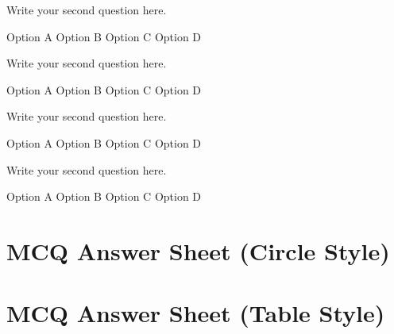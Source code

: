 \documentclass[a4paper,14pt,oneside]{hcmusquiz}
\begin{document}
\begin{questions}
    \question[1] Write your second question here.

    \begin{oneparchoices}
        \choice Option A
        \choice Option B
        \correctchoice Option C
        \choice Option D
    \end{oneparchoices}
    
    \question[1] Write your second question here.

    \begin{oneparchoices}
        \choice Option A
        \choice Option B
        \correctchoice Option C
        \choice Option D
    \end{oneparchoices}
    
    \question[1] Write your second question here.

    \begin{oneparchoices}
        \choice Option A
        \correctchoice Option B
        \choice Option C
        \choice Option D
    \end{oneparchoices}
    
    \question[1] Write your second question here.

    \begin{oneparchoices}
        \choice Option A
        \choice Option B
        \choice Option C
        \correctchoice Option D
    \end{oneparchoices}

\end{questions}
\vfill

\section*{MCQ Answer Sheet (Circle Style)}

\vspace{0.5cm}

\section*{MCQ Answer Sheet (Table Style)}

\vfill
{}
\end{document}
